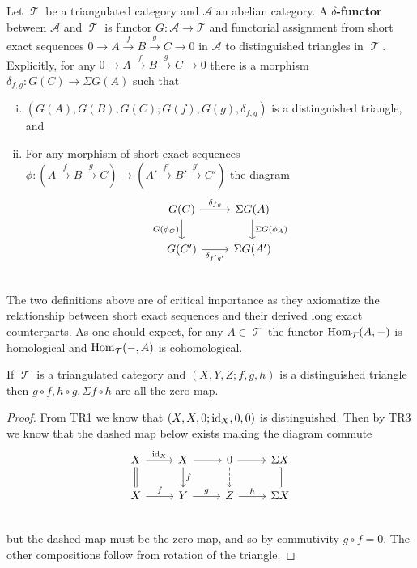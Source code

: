 \documentclass[11pt]{article}
\DeclareMathOperator{\TT}{\mathcal{T}}
\begin{document}
\begin{defn}
Let $\TT$ be a triangulated category and $\mathcal{A}$ an abelian category. A \textbf{$\delta$-functor} between $\mathcal{A}$ and $\TT$ is functor $G: \mathcal{A} \to \mathcal{T}$ and functorial assignment from short exact sequences $0 \to A \xrightarrow{f} B \xrightarrow{g} C \to 0$ in $\mathcal{A}$ to distinguished triangles in $\TT$. Explicitly, for any $0 \to A \xrightarrow{f} B \xrightarrow{g} C \to 0$ there is a morphism $\delta_{f,g}: G(C) \to \Sigma G(A)$ such that
\begin{enumerate}[i.]
	\item $(G(A),G(B),G(C); G(f),G(g),\delta_{f,g})$ is a distinguished triangle, and
	\item For any morphism of short exact sequences $\phi: (A \xrightarrow{f} B \xrightarrow{g} C) \to (A' \xrightarrow{f'} B' \xrightarrow{g'} C')$ the diagram 
		\[\begin{tikzcd}
G(C) \ar[r,"\delta_{fg}"] \ar[d,"G(\phi_C)"'] & \Sigma G(A) \ar[d,"\Sigma G(\phi_A)"] \\
G(C') \ar[r,"\delta_{f'g'}"'] & \Sigma G(A') \\
		\end{tikzcd}\]
\end{enumerate}
\end{defn}

The two definitions above are of critical importance as they axiomatize the relationship between short exact sequences and their derived long exact counterparts. As one should expect, for any $A \in \TT$ the functor $\Hom_{\TT}(A,-)$ is homological and $\Hom_{\TT}(-,A)$ is cohomological.

\begin{lem}
If $\TT$ is a triangulated category and $(X,Y,Z; f,g,h)$ is a distinguished triangle then $g\circ f,h\circ g,\Sigma f\circ h$ are all the zero map.
\end{lem}
\begin{proof}
From TR1 we know that $(X,X,0; \operatorname{id}_X, 0,0)$ is distinguished. Then by TR3 we know that the dashed map below exists making the diagram commute
\[\begin{tikzcd}
X \ar[r,"\id_X"] \ar[d, equal] & X \ar[r] \ar[d,"f"] & 0 \ar[d,dashed] \ar[r] & \Sigma X \ar[d,equal]\\
X \ar[r,"f"] & Y \ar[r,"g"] & Z \ar[r,"h"] & \Sigma X\\
\end{tikzcd}\]
but the dashed map must be the zero map, and so by commutivity $g\circ f= 0 $. The other compositions follow from rotation of the triangle.
\end{proof}
\end{document}
